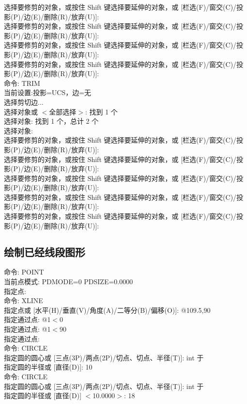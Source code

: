 选择要修剪的对象，或按住 Shift 键选择要延伸的对象，或
[栏选(F)/窗交(C)/投影(P)/边(E)/删除(R)/放弃(U)]:\\
选择要修剪的对象，或按住 Shift 键选择要延伸的对象，或
[栏选(F)/窗交(C)/投影(P)/边(E)/删除(R)/放弃(U)]:\\
选择要修剪的对象，或按住 Shift 键选择要延伸的对象，或
[栏选(F)/窗交(C)/投影(P)/边(E)/删除(R)/放弃(U)]:\\
选择要修剪的对象，或按住 Shift 键选择要延伸的对象，或
[栏选(F)/窗交(C)/投影(P)/边(E)/删除(R)/放弃(U)]:\\
命令:  TRIM\\
当前设置:投影=UCS，边=无\\
选择剪切边...\\
选择对象或 $<$全部选择$>$:  找到 1 个\\
选择对象: 找到 1 个，总计 2 个\\
选择对象:\\
选择要修剪的对象，或按住 Shift 键选择要延伸的对象，或
[栏选(F)/窗交(C)/投影(P)/边(E)/删除(R)/放弃(U)]:\\
选择要修剪的对象，或按住 Shift 键选择要延伸的对象，或
[栏选(F)/窗交(C)/投影(P)/边(E)/删除(R)/放弃(U)]:\\
选择要修剪的对象，或按住 Shift 键选择要延伸的对象，或
[栏选(F)/窗交(C)/投影(P)/边(E)/删除(R)/放弃(U)]:\\
选择要修剪的对象，或按住 Shift 键选择要延伸的对象，或
[栏选(F)/窗交(C)/投影(P)/边(E)/删除(R)/放弃(U)]:\\
选择要修剪的对象，或按住 Shift 键选择要延伸的对象，或
[栏选(F)/窗交(C)/投影(P)/边(E)/删除(R)/放弃(U)]:\\

\indent
\subsection{绘制已经线段图形}

\noindent
命令: POINT\\
当前点模式:  PDMODE=0  PDSIZE=0.0000\\
指定点:\\
命令: XLINE \\
指定点或 [水平(H)/垂直(V)/角度(A)/二等分(B)/偏移(O)]: @109.5,90\\
指定通过点: @1$<$0\\
指定通过点: @1$<$90\\
指定通过点:\\
命令: CIRCLE \\
指定圆的圆心或 [三点(3P)/两点(2P)/切点、切点、半径(T)]: int 于\\
指定圆的半径或 [直径(D)]: 10\\
命令:  CIRCLE \\
指定圆的圆心或 [三点(3P)/两点(2P)/切点、切点、半径(T)]: int 于\\
指定圆的半径或 [直径(D)] $<$10.0000$>$: 18\\

